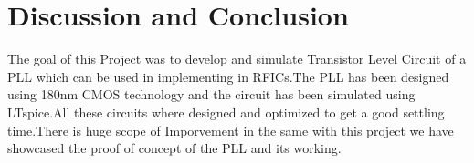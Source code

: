 \chapter{Discussion and Conclusion}

The goal of this Project was to develop and simulate Transistor Level Circuit of a PLL which can be used in implementing in RFICs.The PLL has been designed using 180nm CMOS technology and the circuit has been simulated using LTspice.All these circuits where designed and optimized to get a good settling time.There is huge scope of Imporvement in the same with this project we have showcased the proof of concept of the PLL and its working.